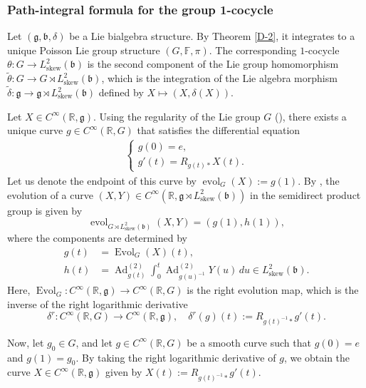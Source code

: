 \documentclass[11pt,reqno]{amsart}
\theoremstyle{definition}
\numberwithin{equation}{section}
\begin{document}
\subsubsection{Path-integral formula for the group 1-cocycle}

Let $(\mathfrak{g}, \mathfrak{b}, \delta)$ be a Lie bialgebra structure. By Theorem \ref{D-2}, it integrates to a unique Poisson Lie group structure $(G, \mathbb{F}, \pi)$. The corresponding $1$-cocycle $\theta: G \to L^2_{\text{skew}}(\mathfrak{b})$ is the second component of the Lie group homomorphism $\tilde{\theta}: G \to G \rtimes L^2_{\text{skew}}(\mathfrak{b})$, which is the integration of the Lie algebra morphism $\tilde{\delta}: \mathfrak{g} \to \mathfrak{g} \rtimes L^2_{\text{skew}}(\mathfrak{b})$ defined by $X \mapsto (X, \delta(X))$. 

Let $X \in C^\infty(\mathbb{R}, \mathfrak{g})$. Using the regularity of the Lie group $G$ (\cite[Definition 5.3]{22}), there exists a unique curve $g \in C^\infty(\mathbb{R}, G)$ that satisfies the differential equation
\begin{align*}
\begin{cases}   
g(0) = e, \\
g'(t) = R_{g(t)*}X(t).
\end{cases} 
\end{align*}
Let us denote the endpoint of this curve by $\operatorname{evol}_{G}(X) := g(1)$. By \cite[Corollary 5.9]{20}, the evolution of a curve $(X, Y) \in C^\infty(\mathbb{R}, \mathfrak{g} \rtimes L^2_{\text{skew}}(\mathfrak{b}))$ in the semidirect product group is given by
\[
\operatorname{evol}_{G \rtimes L^2_{\text{skew}}(\mathfrak{b})}(X, Y) = (g(1), h(1)),
\]
where the components are determined by
\begin{align*}
g(t) &= \operatorname{Evol}_{G}(X)(t), \\
h(t) &= \operatorname{Ad}^{(2)}_{g(t)} \int_{0}^{t} \operatorname{Ad}^{(2)}_{g(u)^{-1}} Y(u) \, du \in L^2_{\text{skew}}(\mathfrak{b}).
\end{align*}
Here, $\operatorname{Evol}_G: C^\infty(\mathbb{R}, \mathfrak{g}) \to C^\infty(\mathbb{R}, G)$ is the right evolution map, which is the inverse of the right logarithmic derivative
\[
\delta^r: C^\infty(\mathbb{R}, G) \to C^\infty(\mathbb{R}, \mathfrak{g}), \quad \delta^r(g)(t) := R_{g(t)^{-1}*} g'(t).
\]

Now, let $g_0 \in G$, and let $g \in C^\infty(\mathbb{R}, G)$ be a smooth curve such that $g(0) = e$ and $g(1) = g_0$. By taking the right logarithmic derivative of $g$, we obtain the curve $X \in C^\infty(\mathbb{R}, \mathfrak{g})$ given by $X(t) := R_{g(t)^{-1}*} g'(t)$.
\end{document}
